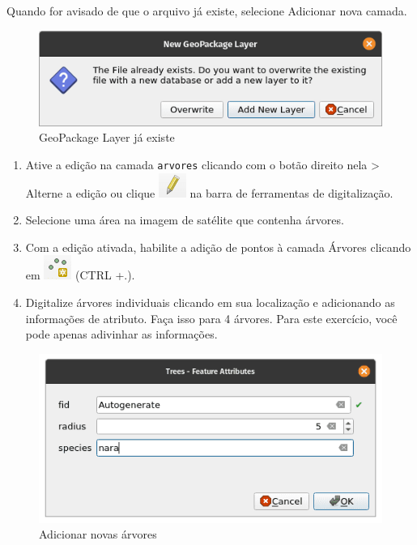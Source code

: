 \documentclass[
]{krantz}
\providecommand{\tightlist}{%
  \setlength{\itemsep}{0pt}\setlength{\parskip}{0pt}}
\begin{document}
Quando for avisado de que o arquivo já existe, selecione Adicionar nova camada.

\begin{figure}
\centering
\includegraphics{media/modulo2/virtual-2.png}
\caption{GeoPackage Layer já existe}
\end{figure}

\begin{enumerate}
\def\labelenumi{\arabic{enumi}.}
\setcounter{enumi}{3}
\tightlist
\item
  Ative a edição na camada \texttt{arvores} clicando com o botão direito nela \textgreater{} Alterne a edição ou clique \includegraphics{media/modulo2/symbol-edit.png} na barra de ferramentas de digitalização.
\item
  Selecione uma área na imagem de satélite que contenha árvores.
\item
  Com a edição ativada, habilite a adição de pontos à camada Árvores clicando em \includegraphics{media/modulo2/symbol-add-point.png} (CTRL +.).
\item
  Digitalize árvores individuais clicando em sua localização e adicionando as informações de atributo. Faça isso para 4 árvores. Para este exercício, você pode apenas adivinhar as informações.
\end{enumerate}

\begin{figure}
\centering
\includegraphics{media/modulo2/virtual-3.png}
\caption{Adicionar novas árvores}
\end{figure}
\end{document}
